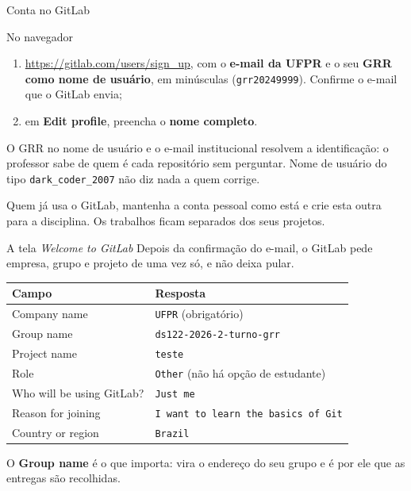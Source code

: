 \documentclass{beamer}
\newenvironment{nonavegador}
  {\begin{exampleblock}{No navegador}}
  {\end{exampleblock}}
\begin{document}
\begin{frame}{Conta no GitLab}
  \begin{nonavegador}
    \begin{enumerate}
      \item \url{https://gitlab.com/users/sign_up}, com o \textbf{e-mail da
            UFPR} e o seu \textbf{GRR como nome de usuário}, em minúsculas
            (\texttt{grr20249999}). Confirme o e-mail que o GitLab envia;
      \item em \textbf{Edit profile}, preencha o \textbf{nome completo}.
    \end{enumerate}
  \end{nonavegador}

  \vspace{0.4cm}
  O GRR no nome de usuário e o e-mail institucional resolvem a identificação:
  o professor sabe de quem é cada repositório sem perguntar. Nome de usuário do
  tipo \texttt{dark\_coder\_2007} não diz nada a quem corrige.

  \vspace{0.3cm}
  Quem já usa o GitLab, mantenha a conta pessoal como está e crie esta outra
  para a disciplina. Os trabalhos ficam separados dos seus projetos.
\end{frame}

\begin{frame}{A tela \textit{Welcome to GitLab}}
  Depois da confirmação do e-mail, o GitLab pede empresa, grupo e projeto de uma
  vez só, e não deixa pular.

  \vspace{0.2cm}
  \begin{center}
    \small
    \begin{tabular}{ll}
      \toprule
      \textbf{Campo} & \textbf{Resposta} \\
      \midrule
      Company name & \texttt{UFPR} (obrigatório) \\
      Group name & \texttt{ds122-2026-2-turno-grr} \\
      Project name & \texttt{teste} \\
      Role & \texttt{Other} (não há opção de estudante) \\
      Who will be using GitLab? & \texttt{Just me} \\
      Reason for joining & \texttt{I want to learn the basics of Git} \\
      Country or region & \texttt{Brazil} \\
      \bottomrule
    \end{tabular}
  \end{center}

  \vspace{0.2cm}
  \footnotesize O \textbf{Group name} é o que importa: vira o endereço do seu
  grupo e é por ele que as entregas são recolhidas.
\end{frame}
\end{document}
